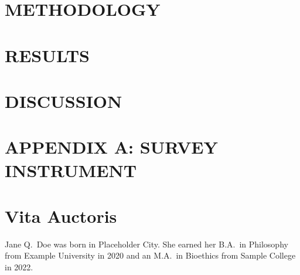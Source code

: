 \documentclass[12pt,oneside]{book}
\begin{document}
\chapter{METHODOLOGY}
\lipsum[4]

\chapter{RESULTS}
\lipsum[5]

\chapter{DISCUSSION}
\lipsum[6]

\appendix
\chapter{APPENDIX A: SURVEY INSTRUMENT}
\lipsum[12]

\backmatter
\singlespacing
\doublespacing

\chapter*{Vita Auctoris}
Jane Q. Doe was born in Placeholder City. She earned her B.A.\ in Philosophy
from Example University in 2020 and an M.A.\ in Bioethics from Sample College
in 2022.
\end{document}
